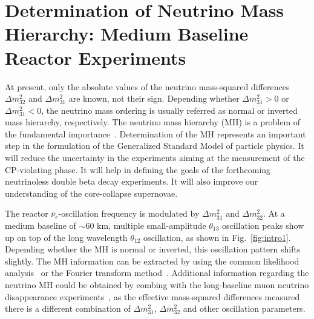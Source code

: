 \newcommand{\fixit}[1]{{\color{red}FIXIT: #1}}
\section{Determination of Neutrino Mass Hierarchy: Medium Baseline Reactor Experiments}

At present, only the absolute values of the neutrino mass-squared differences $\Delta m^2_{32}$ and $\Delta m^2_{31}$ are known, not their sign. 
Depending whether $\Delta m^2_{31}>0$ or $\Delta m^2_{31}<0$, the neutrino mass ordering is usually referred as normal or inverted mass hierarchy, respectively. 
The neutrino mass hierarchy (MH) is a problem of the fundamental importance~\cite{MHwhitepaper}.
Determination of the MH represents an important step in the formulation of the Generalized Standard Model of particle physics. 
It will reduce the uncertainty in the experiments aiming at the measurement of the CP-violating phase. 
It will help in defining the goals of the forthcoming neutrinoless double beta decay experiments.
It will also improve our understanding of the core-collapse supernovae.

The reactor $\bar\nu_e$-oscillation frequency is modulated by $\Delta m^2_{31}$ and $\Delta m^2_{32}$. 
At a medium baseline of $\sim$60 km, multiple small-amplitude $\theta_{13}$ oscillation peaks show up on top of the long wavelength $\theta_{12}$ oscillation, as shown in Fig.~\ref{fig:intro1}.
Depending whether the MH is normal or inverted, this oscillation pattern shifts slightly.
The MH information can be extracted by using the common likelihood analysis~\cite{Li-PRD13} or the Fourier transform method~\cite{Zhan-PRD08,Zhan-PRD09}. 
Additional information regarding the neutrino MH could be obtained by combing with the long-baseline muon neutrino disappearance experiments~\cite{Minakata}, as the effective mass-squared differences measured there is a different combination of $\Delta m^2_{31}$, $\Delta m^2_{32}$ and other oscillation parameters.

